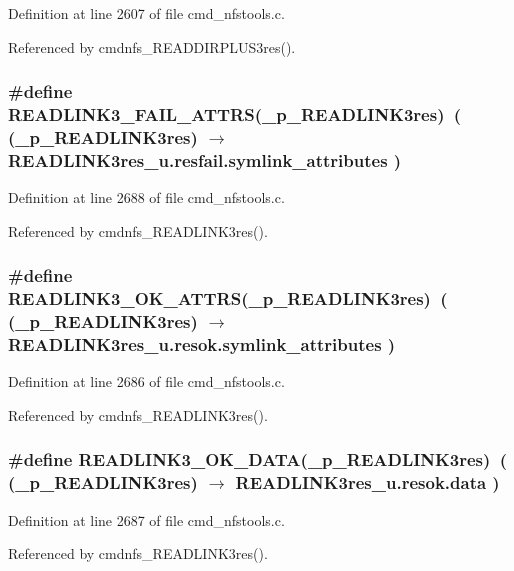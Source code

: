 Definition at line 2607 of file cmd\_\-nfstools.c.

Referenced by cmdnfs\_\-READDIRPLUS3res().
\subsubsection{\setlength{\rightskip}{0pt plus 5cm}\#define READLINK3\_\-FAIL\_\-ATTRS(\_\-p\_\-READLINK3res)\ ( (\_\-p\_\-READLINK3res) $\rightarrow$ READLINK3res\_\-u.resfail.symlink\_\-attributes )}\label{cmd__nfstools_8c_a19}




Definition at line 2688 of file cmd\_\-nfstools.c.

Referenced by cmdnfs\_\-READLINK3res().
\subsubsection{\setlength{\rightskip}{0pt plus 5cm}\#define READLINK3\_\-OK\_\-ATTRS(\_\-p\_\-READLINK3res)\ ( (\_\-p\_\-READLINK3res) $\rightarrow$ READLINK3res\_\-u.resok.symlink\_\-attributes )}\label{cmd__nfstools_8c_a17}




Definition at line 2686 of file cmd\_\-nfstools.c.

Referenced by cmdnfs\_\-READLINK3res().
\subsubsection{\setlength{\rightskip}{0pt plus 5cm}\#define READLINK3\_\-OK\_\-DATA(\_\-p\_\-READLINK3res)\ ( (\_\-p\_\-READLINK3res) $\rightarrow$ READLINK3res\_\-u.resok.data )}\label{cmd__nfstools_8c_a18}




Definition at line 2687 of file cmd\_\-nfstools.c.

Referenced by cmdnfs\_\-READLINK3res().
